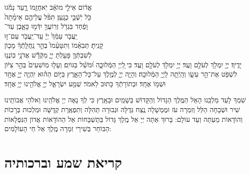 \documentclass[twoside, openany, parskip=half, 11pt]{book}
\begin{document}
אֱד֔וֹם \hfill אֵילֵ֣י מוֹאָ֔ב יֹֽאחֲזֵ֖מוֹ רָ֑עַד \hfill נָמֹ֕גוּ\\
כֹּ֖ל יֹֽשְֿׁבֵ֥י כְנָֽעַן׃ \hfill תִּפֹּ֨ל עֲלֵיהֶ֤ם אֵימָ֨תָה֙ \\
וָפַ֔חַד \hfill בִּגְדֹ֥ל זְרֽוֹעֲךָ֖ יִדְּֿמ֣וּ כָּאָ֑בֶן \hfill עַד־ \\
יַֽעֲבֹ֤ר עַמְּֿךָ֙ יְיָ֔ \hfill עַֽד־יַֽעֲבֹ֖ר עַם־ז֣וּ \\
קָנִֽיתָ׃ \hfill תְּבִאֵ֗מוֹ וְתִטָּעֵ֨מוֹ֙ בְּהַ֣ר נַֽחֲלָֽתְֿךָ֔ \hfill מָכ֧וֹן \\
לְשִׁבְתְּֿךָ֛ פָּעַ֖לְתָּ יְיָ֑ \hfill מִקְּֿדָ֕שׁ אֲדֹנָ֖י כּֽוֹנֲנ֥וּ \\
יָדֶֽיךָ׃ \hfill יְיָ֥ יִמְלֹ֖ךְ לְעֹלָ֥ם וָעֶֽד׃\hfill \break
יְיָ֥ יִמְלֹ֖ךְ לְעֹלָ֥ם וָעֶֽד׃
כִּי ֖לַיְיָ הַמְּֿלוּכָ֑ה וּ֝מֹשֵׁ֗ל בַּגּוֹיִֽם׃
וְעָל֤וּ מֽוֹשִׁעִים֙ בְּהַ֣ר צִיּ֔וֹן לִשְׁפֹּ֖ט אֶת־הַ֣ר עֵשָׂ֑ו וְהָֽיְֿתָ֥ה לַֽיְיָ֖ הַמְּֿלוּכָֽה׃
וְהָיָ֧ה יְיָ֛ לְמֶ֖לֶךְ עַל־כָּל־הָאָ֑רֶץ בַּיּ֣וֹם הַה֗וּא יִֽהְיֶ֧ה יְיָ֛ אֶחָ֖ד וּשְׁמ֥וֹ אֶחָֽד׃
 וּבְתוֹרָתְֿךָ כָּתוּב לֵאמֹר׃
שְׁמַ֖ע יִשְׂרָאֵ֑ל יְיָ֥ אֱלֹהֵ֖ינוּ יְיָ֥ אֶחָֽד׃

 \pageref{nishmas}

 שִׁמְךָ לָעַד מַלְכֵּֽנוּ הָאֵל הַמֶּֽלֶךְ הַגָּדוֹל וְהַקָּדוֹשׁ בַּשָׁמַֽיִם וּבָאָֽרֶץ כִּי לְךָ נָאֶה יְיָ אֱלֹהֵֽינוּ וֵאלֹהֵי אֲבוֹתֵֽינוּ שִׁיר וּשְׁבָחָה הַלֵּל וְזִמְרָה עֹז וּמֶמְשָׁלָה נֶֽצַח גְּדֻלָּה וּגְבוּרָה תְּהִלָּה וְתִפְאֶֽרֶת קְדֻשָּׁה וּמַלְכוּת בְּרָכוֹת וְהוֹדָאוֹת מֵעַתָּה וְעַד עוֹלָם: בָּרוּךְ אַתָּה יְיָ אֵל מֶֽלֶךְ גָּדוֹל בַּתֻּשְׁבָּחוֹת אֵל הַהוֹדָאוֹת אֲדוֹן הַנִּפְלָאוֹת הַבּוֹחֵר בְּשִׁירֵי זִמְרָה מֶֽלֶךְ אֵל חַי הָעוֹלָמִים:

\halfkaddish


\section[קריאת שמע וברכותיה]{ קריאת שמע וברכותיה }
\end{document}

